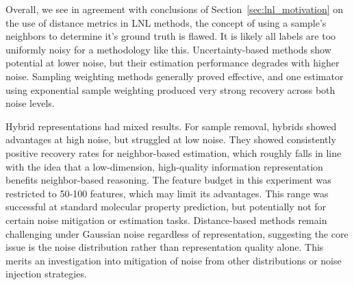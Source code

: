 %
%
%

Overall, we see in agreement with conclusions of Section~\ref{sec:lnl_motivation} on the use of distance metrics in LNL methods, the concept of using a sample's neighbors to determine it's ground truth is flawed. It is likely all labels are too uniformly noisy for a methodology like this. Uncertainty-based methods show potential at lower noise, but their estimation performance degrades with higher noise. Sampling weighting methods generally proved effective, and one estimator using exponential sample weighting produced very strong recovery across both noise levels.

Hybrid representations had mixed results. For sample removal, hybrids showed advantages at high noise, but struggled at low noise. They showed consistently positive recovery rates for neighbor-based estimation, which roughly falls in line with the idea that a low-dimension, high-quality information representation benefits neighbor-based reasoning. The feature budget in this experiment was restricted to 50-100 features, which may limit its advantages. This range was successful at standard molecular property prediction, but potentially not for certain noise mitigation or estimation tasks. Distance-based methods remain challenging under Gaussian noise regardless of representation, suggesting the core issue is the noise distribution rather than representation quality alone. This merits an investigation into mitigation of noise from other distributions or noise injection strategies.


